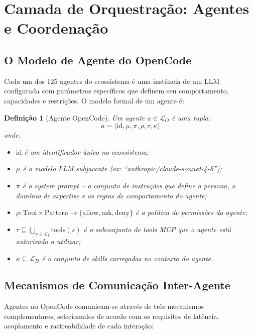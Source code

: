 \documentclass[12pt,a4paper,sumario=tradicional,openany]{abntex2}
\newtheorem{definition}{Definição}[chapter]
\begin{document}
\section{Camada de Orquestração: Agentes e Coordenação}

\subsection{O Modelo de Agente do OpenCode}

Cada um dos 125 agentes do ecossistema é uma instância de um LLM configurada com parâmetros específicos que definem seu comportamento, capacidades e restrições. O modelo formal de um agente é:

\begin{definition}[Agente OpenCode]
Um agente $a \in \mathcal{L}_O$ é uma tupla:
\begin{equation}
a = \langle \text{id}, \mu, \pi, \rho, \tau, \kappa \rangle
\end{equation}
onde:
\begin{itemize}
    \item $\text{id}$ é um identificador único no ecossistema;
    \item $\mu$ é o modelo LLM subjacente (ex: ``anthropic/claude-sonnet-4-6'');
    \item $\pi$ é o system prompt -- o conjunto de instruções que define a persona, o domínio de expertise e as regras de comportamento do agente;
    \item $\rho: \text{Tool} \times \text{Pattern} \rightarrow \{\text{allow}, \text{ask}, \text{deny}\}$ é a política de permissões do agente;
    \item $\tau \subseteq \bigcup_{s \in \mathcal{L}_I} \text{tools}(s)$ é o subconjunto de tools MCP que o agente está autorizado a utilizar;
    \item $\kappa \subseteq \mathcal{L}_D$ é o conjunto de skills carregadas no contexto do agente.
\end{itemize}
\end{definition}

\subsection{Mecanismos de Comunicação Inter-Agente}

Agentes no OpenCode comunicam-se através de três mecanismos complementares, selecionados de acordo com os requisitos de latência, acoplamento e rastreabilidade de cada interação:
\end{document}
